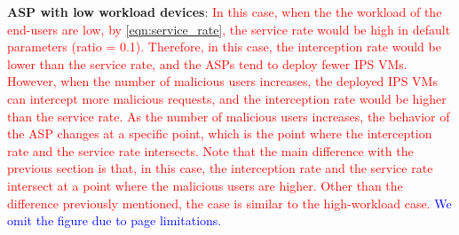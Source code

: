 \documentclass[10pt,journal, compsoc]{IEEEtran}
\begin{document}


\textbf{ASP with low workload devices}: \textcolor{red}{In this case, when the the workload of the end-users are low, by \cref{eqn:service_rate}, the service rate would be high in default parameters (ratio = 0.1). Therefore, in this case, the interception rate would be lower than the service rate, and the ASPs tend to deploy fewer IPS VMs. However, when the number of malicious users increases, the deployed IPS VMs can intercept more malicious requests, and the interception rate would be higher than the service rate. As the number of malicious users increases, the behavior of the ASP changes at a specific point, which is the point where the interception rate and the service rate intersects. Note that the main difference with the previous section is that, in this case, the interception rate and the service rate intersect at a point where the malicious users are higher. Other than the difference previously mentioned, the case is similar to the high-workload case.} \textcolor{blue}{We omit the figure due to page limitations.}


\end{document}
